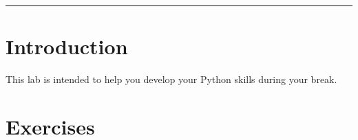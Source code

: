 \documentclass[11pt]{cselabheader}
\title{\thetitle}
\author{\theauthor}
\date{NMT Department of Computer Science and Engineering}
\newcommand{\thelabnumber}{6 and $\frac{2}{7}$}
\begin{document}
\maketitle
\hrule

%
%
%
%
\section*{Introduction} %
This lab is intended to help you develop your Python skills during your break.

\renewcommand{\thelabnumber}{6.285714}


\newpage
{}

\newpage
\section{Exercises}\label{exercises}
\end{document}
